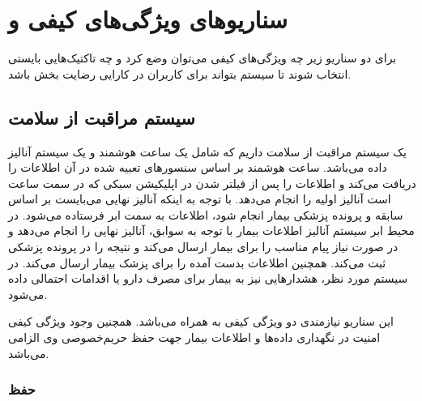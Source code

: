 \newpage
\section{سناریو‌های ویژگی‌های کیفی  و }

برای دو سناریو زیر چه ویژگی‌های کیفی می‌توان وضع کرد و چه تاکتیک‌هایی بایستی
انتخاب شوند تا سیستم بتواند برای کاربران در کارایی رضایت بخش باشد.

\subsection{سیستم مراقبت از سلامت}

یک سیستم مراقبت از سلامت داریم که شامل یک ساعت هوشمند و یک سیستم آنالیز داده
می‌باشد. ساعت هوشمند بر اساس سنسور‌های تعبیه شده در آن اطلاعات را دریافت می‌کند
و اطلاعات را پس از فیلتر شدن در اپلیکیشن سبکی که در سمت ساعت است آنالیز اولیه را
انجام می‌دهد. با توجه به اینکه آنالیز نهایی می‌بایست بر اساس سابقه و پرونده
پزشکی بیمار انجام شود، اطلاعات به سمت ابر فرستاده می‌شود. در محیط ابر سیستم
آنالیز اطلاعات بیمار با توجه به سوابق، آنالیز نهایی را انجام می‌دهد و در صورت
نیاز پیام مناسب را برای بیمار ارسال می‌کند و نتیجه را در پرونده پزشکی ثبت
می‌کند. همچنین اطلاعات بدست آمده را برای پزشک بیمار ارسال می‌کند. در سیستم مورد
نظر، هشدار‌هایی نیز به بیمار برای مصرف دارو یا اقدامات احتمالی داده می‌شود.

این سناریو نیازمندی دو ویژگی کیفی  به همراه
 می‌باشد. همچنین وجود ویژگی کیفی امنیت در نگهداری داده‌ها و
اطلاعات بیمار جهت حفظ حریم‌خصوصی وی الزامی می‌باشد.

\subsubsection*{حفظ }

